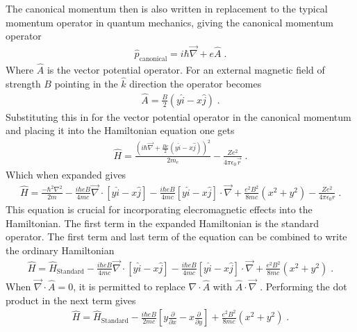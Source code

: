         The canonical momentum then is also written in replacement to the typical momentum operator in quantum mechanics, giving the canonical momentum operator 
        \begin{align}
            \hat{p}_{\text{canonical}} = i \hbar \vec{\nabla} + e \hat{A} \;.
        \end{align}
        \noindent Where $\hat{A}$ is the vector potential operator. For an external magnetic field of strength $B$ pointing in the $\hat{k}$ direction the operator becomes 
        \begin{align}
            \hat{A} = \frac{B}{2} \left(y \hat{i} - x \hat{j} \right)\;.
        \end{align}
        \noindent Substituting this in for the vector potential operator in the canonical momentum and placing it into the Hamiltonian equation one gets 
        \begin{align}
            \hat{H} = \frac{\left(i\hbar \vec{\nabla} + \frac{Be}{2}\left(y \hat{i} - x \hat{j} \right)\right)^2}{2m_e} - \frac{Ze^2}{4 \pi \epsilon_0 \vec{r}}\;.
        \end{align}
        \noindent Which when expanded gives
        \small
        \begin{align}
            \hat{H} = \frac{-\hbar^2 \nabla^2}{2m} - \frac{i\hbar e B}{4mc} \vec{\nabla} \cdot \left[y\hat{i} - x\hat{j} \right] - \frac{i\hbar e B}{4mc} \left[y\hat{i} - x\hat{j} \right] \cdot \vec{\nabla} + \frac{e^2B^2}{8mc} \left(x^2 + y^2\right) - \frac{Ze^2}{4\pi \epsilon_0 r}\;.
        \end{align}
        \normalsize
        \noindent This equation is crucial for incorporating elecromagnetic effects into the Hamiltonian. The first term in the expanded Hamiltonian is the standard operator. The first term and last term of the equation can be combined to write the ordinary Hamiltonian 
        \begin{align}
            \hat{H} =  \hat{H}_{\text{Standard}} - \frac{i\hbar e B}{4mc} \vec{\nabla} \cdot \left[y\hat{i} - x\hat{j} \right] - \frac{i\hbar e B}{4mc} \left[y\hat{i} - x\hat{j} \right] \cdot \vec{\nabla} + \frac{e^2B^2}{8mc} \left(x^2 + y^2\right)\;.
        \end{align}
        \noindent When $\vec{\nabla} \cdot \hat{A} = 0$, it is permitted to replace $\nabla \cdot \hat{A}$ with $\hat{A} \cdot \vec{\nabla}$ \cite{Sakurai_Napolitano_2020}. Performing the dot product in the next term gives 
        \begin{align}
            \hat{H} =  \hat{H}_{\text{Standard}} - \frac{i\hbar e B}{2mc} \left[y \frac{\partial}{\partial x} - x \frac{\partial}{\partial y} \right]+ \frac{e^2B^2}{8mc} \left(x^2 + y^2\right)\;.
        \end{align}
